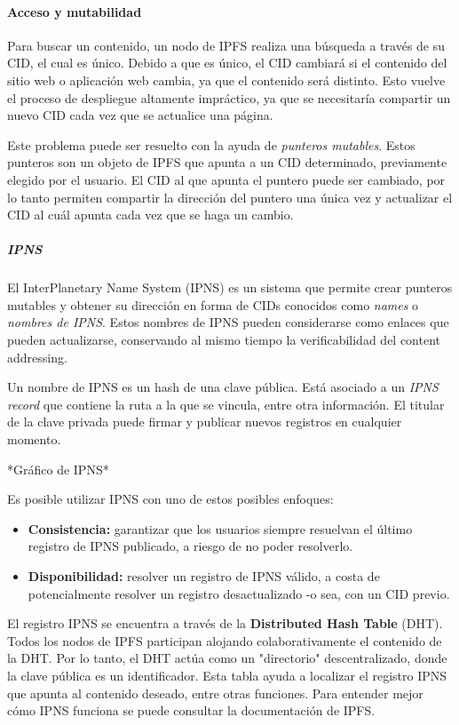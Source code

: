 \paragraph{Acceso y mutabilidad}

Para buscar un contenido, un nodo de IPFS realiza una búsqueda a través de su CID, el cual es único. Debido a que es único, el CID cambiará si el contenido del sitio web o aplicación web cambia, ya que el contenido será distinto. Esto vuelve el proceso de despliegue altamente impráctico, ya que se necesitaría compartir un nuevo CID cada vez que se actualice una página.

Este problema puede ser resuelto con la ayuda de \textit{punteros mutables}. Estos punteros son un objeto de IPFS que apunta a un CID determinado, previamente elegido por el usuario. El CID al que apunta el puntero puede ser cambiado, por lo tanto permiten compartir la dirección del puntero una única vez y actualizar el CID al cuál apunta cada vez que se haga un cambio.

\subparagraph{IPNS}

El InterPlanetary Name System (IPNS) \cite{ipns} es un sistema que permite crear  punteros mutables y obtener su dirección en forma de CIDs conocidos como \textit{names} o \textit{nombres de IPNS}. Estos nombres de IPNS pueden considerarse como enlaces que pueden actualizarse, conservando al mismo tiempo la verificabilidad del content addressing.

Un nombre de IPNS es un hash de una clave pública. Está asociado a un \textit{IPNS record} que contiene la ruta a la que se vincula, entre otra información. El titular de la clave privada puede firmar y publicar nuevos registros en cualquier momento.

*Gráfico de IPNS*

Es posible utilizar IPNS con uno de estos posibles enfoques:
\begin{itemize}
    \item \textbf{Consistencia:} garantizar que los usuarios siempre resuelvan el último registro de IPNS publicado, a riesgo de no poder resolverlo.
    \item \textbf{Disponibilidad:} resolver un registro de IPNS válido, a costa de potencialmente resolver un registro desactualizado -o sea, con un CID previo.
\end{itemize}

El registro IPNS se encuentra a través de la \textbf{Distributed Hash Table} (DHT). Todos los nodos de IPFS participan alojando colaborativamente el contenido de la DHT. Por lo tanto, el DHT actúa como un "directorio" descentralizado, donde la clave pública es un identificador. Esta tabla ayuda a localizar el registro IPNS que apunta al contenido deseado, entre otras funciones. Para entender mejor cómo IPNS funciona se puede consultar la documentación de IPFS.

